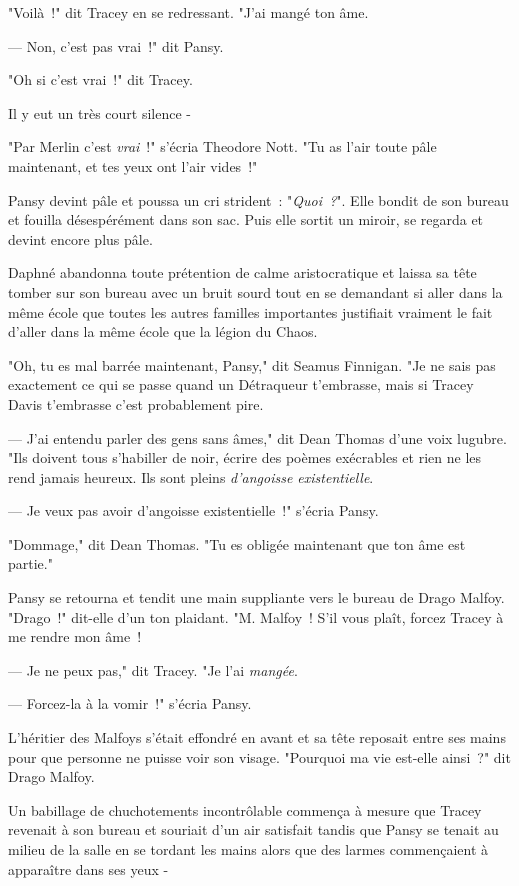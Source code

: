 "Voilà~!" dit Tracey en se redressant. "J'ai mangé ton âme.

--- Non, c'est pas vrai~!" dit Pansy.

"Oh si c'est vrai~!" dit Tracey.

Il y eut un très court silence -

"Par Merlin c'est \emph{vrai}~!" s'écria Theodore Nott. "Tu as l'air toute pâle maintenant, et tes yeux ont l'air vides~!"

Pansy devint pâle et poussa un cri strident~: "\emph{Quoi~?}". Elle bondit de son bureau et fouilla désespérément dans son sac. Puis elle sortit un miroir, se regarda et devint encore plus pâle.

Daphné abandonna toute prétention de calme aristocratique et laissa sa tête tomber sur son bureau avec un bruit sourd tout en se demandant si aller dans la même école que toutes les autres familles importantes justifiait vraiment le fait d'aller dans la même école que la légion du Chaos.

"Oh, tu es mal barrée maintenant, Pansy," dit Seamus Finnigan. "Je ne sais pas exactement ce qui se passe quand un Détraqueur t'embrasse, mais si Tracey Davis t'embrasse c'est probablement pire.

--- J'ai entendu parler des gens sans âmes," dit Dean Thomas d'une voix lugubre. "Ils doivent tous s'habiller de noir, écrire des poèmes exécrables et rien ne les rend jamais heureux. Ils sont pleins \emph{d'angoisse existentielle}.

--- Je veux pas avoir d'angoisse existentielle~!" s'écria Pansy.

"Dommage," dit Dean Thomas. "Tu es obligée maintenant que ton âme est partie."

Pansy se retourna et tendit une main suppliante vers le bureau de Drago Malfoy. "Drago~!" dit-elle d'un ton plaidant. "M. Malfoy~! S'il vous plaît, forcez Tracey à me rendre mon âme~!

--- Je ne peux pas," dit Tracey. "Je l'ai \emph{mangée}.

--- Forcez-la à la vomir~!" s'écria Pansy.

L'héritier des Malfoys s'était effondré en avant et sa tête reposait entre ses mains pour que personne ne puisse voir son visage. "Pourquoi ma vie est-elle ainsi~?" dit Drago Malfoy.

Un babillage de chuchotements incontrôlable commença à mesure que Tracey revenait à son bureau et souriait d'un air satisfait tandis que Pansy se tenait au milieu de la salle en se tordant les mains alors que des larmes commençaient à apparaître dans ses yeux -

